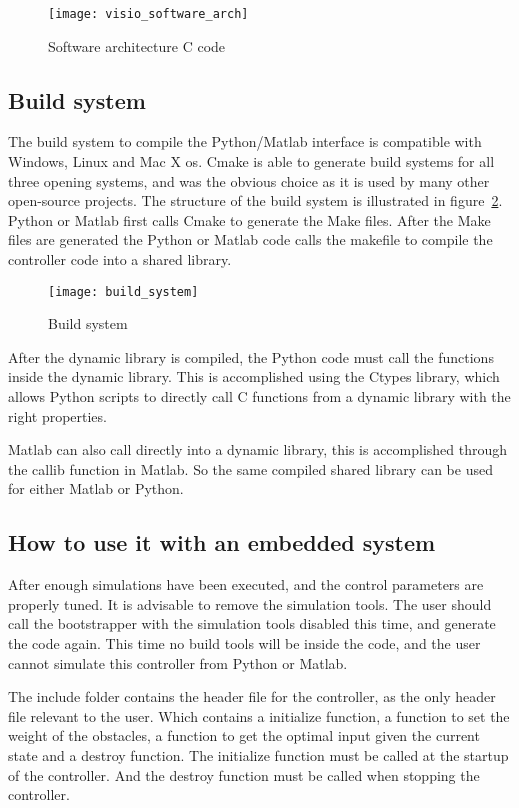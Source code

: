 	\begin{figure}[H]
		\centering
		\texttt{[image: visio\_software\_arch]}
		\caption{Software architecture C code}
		\label{fig:visio software arch}
	\end{figure}

\subsection{Build system}
The build system to compile the Python/Matlab interface is compatible with Windows, Linux and Mac X os. Cmake is able to generate build systems for all three opening systems, and was the obvious choice as it is used by many other open-source projects. The structure of the build system is illustrated in figure~\ref{fig:build system}. Python or Matlab first calls Cmake to generate the Make files. After the Make files are generated the Python or Matlab code calls the makefile to compile the controller code into a shared library.
\begin{figure}[H]
	\centering
	\texttt{[image: build\_system]}
	\caption{Build system}
	\label{fig:build system}
\end{figure}
After the dynamic library is compiled, the Python code must call the functions inside the dynamic library. This is accomplished using the Ctypes library, which allows Python scripts to directly call C functions from a dynamic library with the right properties.

Matlab can also call directly into a dynamic library, this is accomplished through the callib function in Matlab. So the same compiled shared library can be used for either Matlab or Python.

\subsection{How to use it with an embedded system}
After enough simulations have been executed, and the control parameters are properly tuned. It is advisable to remove the simulation tools. The user should call the bootstrapper with the simulation tools disabled this time, and generate the code again. This time no build tools will be inside the code, and the user cannot simulate this controller from Python or Matlab.

The include folder contains the header file for the controller, as the only header file relevant to the user. Which contains a initialize function, a function to set the weight of the obstacles, a function to get the optimal input given the current state and a destroy function. The initialize function must be called at the startup of the controller. And the destroy function must be called when stopping the controller.

